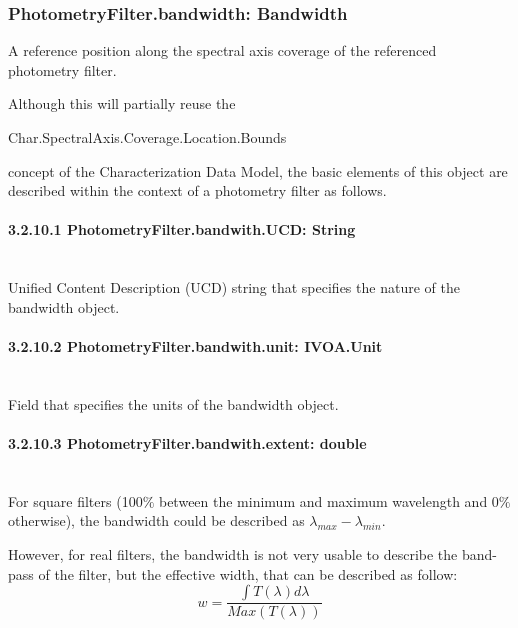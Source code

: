 \documentclass[11pt,a4paper]{ivoa}
\begin{document}
\subsubsection{PhotometryFilter.bandwidth: Bandwidth}
A reference position along the spectral axis coverage of the referenced photometry filter.
\par

Although this will partially reuse the
\par

\begin{center}
Char.SpectralAxis.Coverage.Location.Bounds
\end{center}\par

concept of the Characterization Data Model, the basic elements of this object are described 
within the context of a photometry filter as follows.
\par

\paragraph{3.2.10.1
PhotometryFilter.bandwith.UCD: String} \hspace{0pt} \\
Unified Content Description (UCD) string that specifies the nature of the bandwidth object.
\par

\paragraph{3.2.10.2
PhotometryFilter.bandwith.unit: IVOA.Unit} \hspace{0pt} \\
Field that specifies the units of the bandwidth object.
\par

\paragraph{3.2.10.3
PhotometryFilter.bandwith.extent: double} \hspace{0pt} \\
For square filters (100$\%$  between the minimum and maximum wavelength and 0$\%$  otherwise), 
the bandwidth could be described as $\lambda_{max} - \lambda_{min}$.
\par

However, for real filters, the bandwidth is not very usable to describe the band-pass of the 
filter, but the effective width, that can be described as follow:
\begin{equation} \label{eq:21}
w = \frac{\int T(\lambda)d\lambda}{Max(T(\lambda))}
\end{equation}
\end{document}
